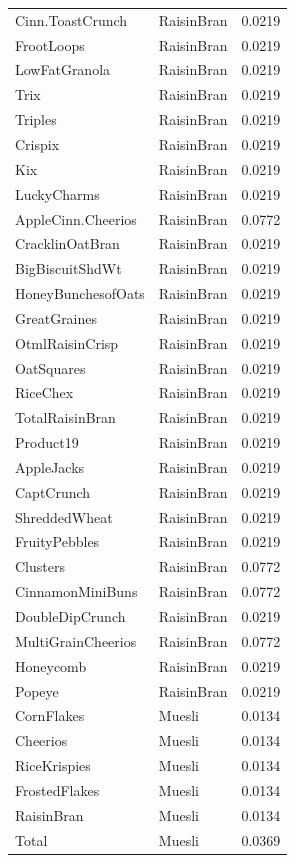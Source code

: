 \begin{table}[!htbp]
\begin{tabular}{lll}
Cinn.ToastCrunch & RaisinBran & 0.0219
\\
FrootLoops & RaisinBran & 0.0219
\\
LowFatGranola & RaisinBran & 0.0219
\\
Trix & RaisinBran & 0.0219
\\
Triples & RaisinBran & 0.0219
\\
Crispix & RaisinBran & 0.0219
\\
Kix & RaisinBran & 0.0219
\\
LuckyCharms & RaisinBran & 0.0219
\\
AppleCinn.Cheerios & RaisinBran & 0.0772
\\
CracklinOatBran & RaisinBran & 0.0219
\\
BigBiscuitShdWt & RaisinBran & 0.0219
\\
HoneyBunchesofOats & RaisinBran & 0.0219
\\
GreatGraines & RaisinBran & 0.0219
\\
OtmlRaisinCrisp & RaisinBran & 0.0219
\\
OatSquares & RaisinBran & 0.0219
\\
RiceChex & RaisinBran & 0.0219
\\
TotalRaisinBran & RaisinBran & 0.0219
\\
Product19 & RaisinBran & 0.0219
\\
AppleJacks & RaisinBran & 0.0219
\\
CaptCrunch & RaisinBran & 0.0219
\\
ShreddedWheat & RaisinBran & 0.0219
\\
FruityPebbles & RaisinBran & 0.0219
\\
Clusters & RaisinBran & 0.0772
\\
CinnamonMiniBuns & RaisinBran & 0.0772
\\
DoubleDipCrunch & RaisinBran & 0.0219
\\
MultiGrainCheerios & RaisinBran & 0.0772
\\
Honeycomb & RaisinBran & 0.0219
\\
Popeye & RaisinBran & 0.0219
\\
CornFlakes & Muesli & 0.0134
\\
Cheerios & Muesli & 0.0134
\\
RiceKrispies & Muesli & 0.0134
\\
FrostedFlakes & Muesli & 0.0134
\\
RaisinBran & Muesli & 0.0134
\\
Total & Muesli & 0.0369
\\

\end{tabular}
\end{table}
